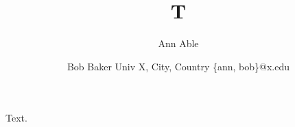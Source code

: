 \documentclass{article}
\begin{document}
\title{T}
\author{Ann Able\and Bob Baker
\affiliations Univ X, City, Country
\emails \{ann, bob\}@x.edu}
\maketitle
Text.
\end{document}
